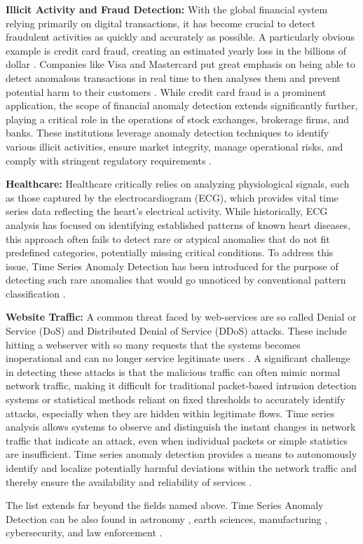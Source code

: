 \documentclass[12pt,oneside]{article}
\begin{document}
\textbf{Illicit Activity and Fraud Detection:} With the global financial system relying primarily on digital transactions, it has become crucial to detect fraudulent activities as quickly and accurately as possible. A particularly obvious example is credit card fraud, creating an estimated yearly loss in the billions of dollar \parencites[p.~2]{FinFraud}. Companies like Visa and Mastercard put great emphasis on being able to detect anomalous transactions in real time to then analyses them and prevent potential harm to their customers \citep{VisaFr}. While credit card fraud is a prominent application, the scope of financial anomaly detection extends significantly further, playing a critical role in the operations of stock exchanges, brokerage firms, and banks. These institutions leverage anomaly detection techniques to identify various illicit activities, ensure market integrity, manage operational risks, and comply with stringent regulatory requirements \citep{DBSurv}. \

\textbf{Healthcare:} Healthcare critically relies on analyzing physiological signals, such as those captured by the electrocardiogram (ECG), which provides vital time series data reflecting the heart's electrical activity. While historically, ECG analysis has focused on identifying established patterns of known heart diseases, this approach often fails to detect rare or atypical anomalies that do not fit predefined categories, potentially missing critical conditions. To address this issue, Time Series Anomaly Detection has been introduced for the purpose of detecting such rare anomalies that would go unnoticed by conventional pattern classification \parencites[p.~1-2]{jiang2024anomalydetectionelectrocardiogramsadvancing}.

\textbf{Website Traffic:} A common threat faced by web-services are so called Denial or Service (DoS) and Distributed Denial of Service (DDoS) attacks. These include hitting a webserver with so many requests that the systems becomes inoperational and can no longer service legitimate users \citep{BSI1}. A significant challenge in detecting these attacks is that the malicious traffic can often mimic normal network traffic, making it difficult for traditional packet-based intrusion detection systems or statistical methods reliant on fixed thresholds to accurately identify attacks, especially when they are hidden within legitimate flows. Time series analysis allows systems to observe and distinguish the instant changes in network traffic that indicate an attack, even when individual packets or simple statistics are insufficient. Time series anomaly detection provides a means to autonomously identify and localize potentially harmful deviations within the network traffic and thereby ensure the availability and reliability of services \parencites[pp.~1-2]{FOULADI2020102587}. \par
The list extends far beyond the fields named above. Time Series Anomaly Detection can be also found in astronomy \citep{astro}, earth sciences, manufacturing \parencites[p.~1]{Zamanzadeh_Darban_2024}, cybersecurity, and law enforcement \parencites[p.~1]{boniol2024divetimeseriesanomalydetection}.
\end{document}
